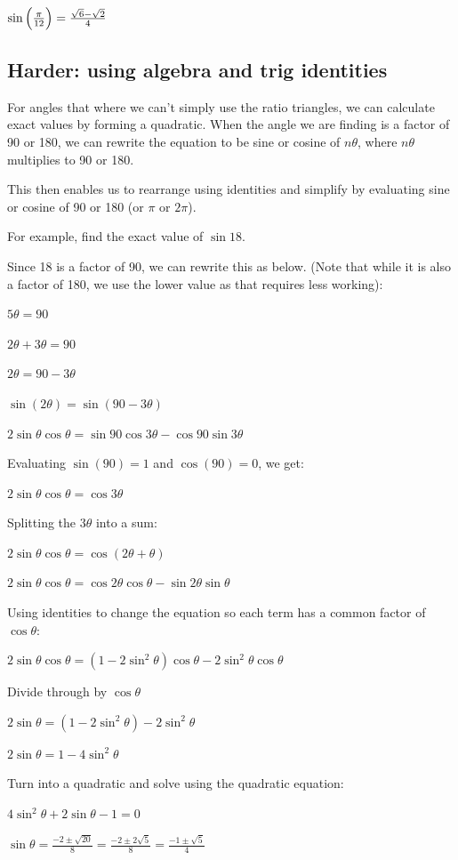 \documentclass[../main.tex]{subfiles}
\begin{document}
$\sin{\Bigl(\frac{\pi}{12}\Bigr)}=\frac{\sqrt{6}-\sqrt{2}}{4}$
\pagebreak
\subsection*{Harder: using algebra and trig identities}
For angles that where we can't simply use the ratio triangles, we can calculate exact values by forming a quadratic. When the angle we are finding is a factor of 90 or 180, we can rewrite the equation to be sine or cosine of $n\theta$, where $n\theta$ multiplies to 90 or 180.

This then enables us to rearrange using identities and simplify by evaluating sine or cosine of 90 or 180 (or $\pi$ or $2\pi$).

For example, find the exact value of $\sin{18}$.

Since 18 is a factor of 90, we can rewrite this as below. (Note that while it is also a factor of 180, we use the lower value as that requires less working):

$5\theta=90$

$2\theta +3\theta=90$

$2\theta = 90-3\theta$

$\sin{(2\theta)}=\sin{(90-3\theta)}$

$2\sin{\theta}\cos{\theta}=\sin{90}\cos{3\theta}-\cos{90}\sin{3\theta}$

Evaluating $\sin{(90)}=1$ and $\cos{(90)}=0$, we get:

$2\sin{\theta}\cos{\theta}=\cos{3\theta}$

Splitting the $3\theta$ into a sum:

$2\sin{\theta}\cos{\theta}=\cos{(2\theta + \theta)}$

$2\sin{\theta}\cos{\theta}=\cos{2\theta}\cos{\theta}-\sin{2\theta}\sin{\theta}$

Using identities to change the equation so each term has a common factor of $\cos{\theta}$:

$2\sin{\theta}\cos{\theta}=(1-2\sin^2{\theta})\cos{\theta}-2\sin^2{\theta}\cos{\theta}$

Divide through by $\cos{\theta}$

$2\sin{\theta}=(1-2\sin^2{\theta})-2\sin^2{\theta}$

$2\sin{\theta}=1-4\sin^2{\theta}$

Turn into a quadratic and solve using the quadratic equation:

$4\sin^2{\theta}+2\sin{\theta}-1=0$

$\sin{\theta}=\frac{-2\pm \sqrt{20}}{8}=\frac{-2\pm 2\sqrt{5}}{8}=\frac{-1\pm \sqrt{5}}{4}$
\end{document}
